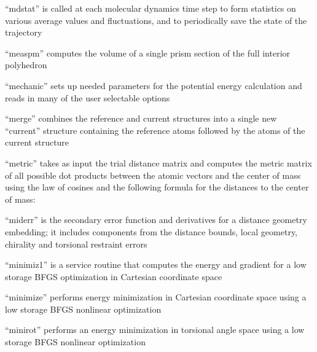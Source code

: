 \documentclass[letterpaper,11pt,english]{sphinxmanual}
\begin{document}

“mdstat” is called at each molecular dynamics time step to
form statistics on various average values and fluctuations,
and to periodically save the state of the trajectory





“measpm” computes the volume of a single prism section of
the full interior polyhedron


“mechanic” sets up needed parameters for the potential energy
calculation and reads in many of the user selectable options


“merge” combines the reference and current structures into
a single new “current” structure containing the reference
atoms followed by the atoms of the current structure


“metric” takes as input the trial distance matrix and computes
the metric matrix of all possible dot products between the atomic
vectors and the center of mass using the law of cosines and the
following formula for the distances to the center of mass:


“miderr” is the secondary error function and derivatives
for a distance geometry embedding; it includes components
from the distance bounds, local geometry, chirality and
torsional restraint errors


“minimiz1” is a service routine that computes the energy and
gradient for a low storage BFGS optimization in Cartesian
coordinate space


“minimize” performs energy minimization in Cartesian coordinate
space using a low storage BFGS nonlinear optimization


“minirot” performs an energy minimization in torsional
angle space using a low storage BFGS nonlinear optimization
\end{document}
